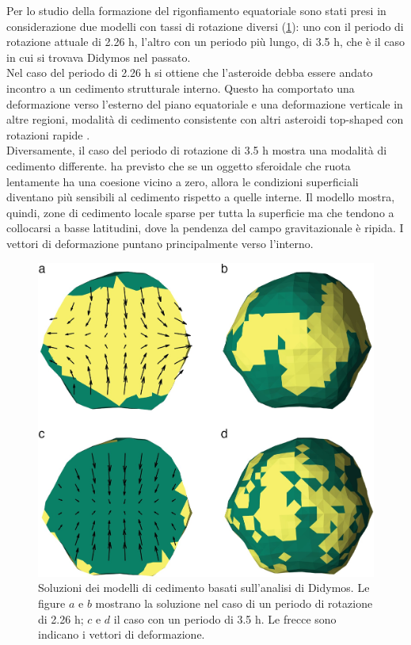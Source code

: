 \documentclass[a4paper,11pt,openright]{book}
\begin{document}
Per lo studio della formazione del rigonfiamento equatoriale sono stati presi in considerazione due modelli con tassi di rotazione diversi (\cref{fig:failure_models}): uno con il periodo di rotazione attuale di 2.26 h, l'altro con un periodo più lungo, di 3.5 h, che è il caso in cui si trovava Didymos nel passato.\\
Nel caso del periodo di 2.26 h si ottiene che l'asteroide debba essere andato incontro a un cedimento strutturale interno. Questo ha comportato una deformazione verso l'esterno del piano equatoriale e una deformazione verticale in altre regioni, modalità di cedimento consistente con altri asteroidi top-shaped con rotazioni rapide \citep{hirabayashi_rotationally_2019}.\\
Diversamente, il caso del periodo di rotazione di 3.5 h mostra una modalità di cedimento differente. \citet{hirabayashi_failure_2015} ha previsto che se un oggetto sferoidale che ruota lentamente ha una coesione vicino a zero, allora le condizioni superficiali diventano più sensibili al cedimento rispetto a quelle interne. Il modello mostra, quindi, zone di cedimento locale sparse per tutta la superficie ma che tendono a collocarsi a basse latitudini, dove la pendenza del campo gravitazionale è ripida. I vettori di deformazione puntano principalmente verso l'interno.

\begin{figure}
    \centering
    \includegraphics[scale=0.6]{figure/failure_models.jpg}
    \caption[Soluzioni dei modelli di cedimento basati sull'analisi di Didymos.]{Soluzioni dei modelli di cedimento basati sull'analisi di Didymos. Le figure $a$ e $b$ mostrano la soluzione nel caso di un periodo di rotazione di 2.26 h; $c$ e $d$ il caso con un periodo di 3.5 h. Le frecce sono indicano i vettori di deformazione. \citep{naidu_radar_2020}}
    \label{fig:failure_models}
\end{figure}
\end{document}
